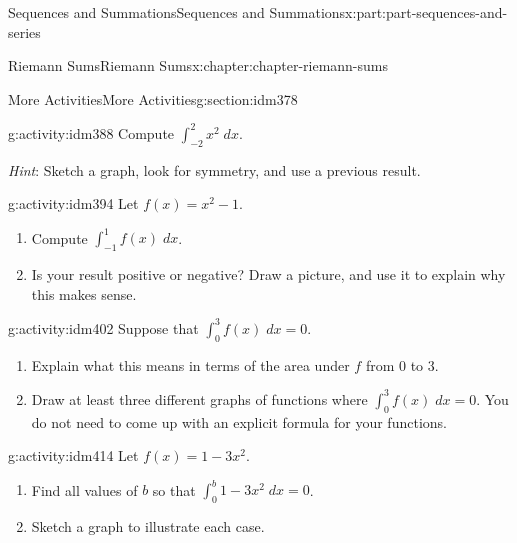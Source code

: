 \documentclass[oneside,10pt,]{book}
\begin{document}
\begin{partptx}{Sequences and Summations}{}{Sequences and Summations}{}{}{x:part:part-sequences-and-series}
\begin{chapterptx}{Riemann Sums}{}{Riemann Sums}{}{}{x:chapter:chapter-riemann-sums}
\begin{sectionptx}{More Activities}{}{More Activities}{}{}{g:section:idm378}
\begin{activity}{}{g:activity:idm388}
Compute \(\displaystyle\int_{-2}^2 x^2 \;dx\).%
\par
\emph{Hint}: Sketch a graph, look for symmetry, and use a previous result.%
\end{activity}
\begin{activity}{}{g:activity:idm394}%
Let \(f(x) = x^2 -1 \).%
\begin{enumerate}[font=\bfseries,label=(\alph*),ref=\alph*]
\item{}Compute \(\displaystyle \int_{-1}^1 f(x)\; dx\).\item{}Is your result positive or negative? Draw a picture, and use it to explain why this makes sense.%
\end{enumerate}
\end{activity}
\begin{activity}{}{g:activity:idm402}%
Suppose that \(\displaystyle \int_0^3 f(x)\;dx = 0\).%
\begin{enumerate}[font=\bfseries,label=(\alph*),ref=\alph*]
\item{}Explain what this means in terms of the area under \(f\) from \(0\) to \(3\).%
\item{}Draw at least three different graphs of functions where \(\displaystyle \int_0^3 f(x)\;dx = 0\). You do not need to come up with an explicit formula for your functions.%
\end{enumerate}
\end{activity}
\begin{activity}{}{g:activity:idm414}%
Let \(f(x) = 1-3x^2\).%
\begin{enumerate}[font=\bfseries,label=(\alph*),ref=\alph*]
\item{}Find all values of \(b\) so that \(\displaystyle\int_0^b 1-3x^2\; dx = 0\).%
\item{}Sketch a graph to illustrate each case.%
\end{enumerate}
\end{activity}
\end{sectionptx}
\end{chapterptx}
\end{partptx}
%
%
\typeout{************************************************}
\typeout{************************************************}
%
\end{document}
